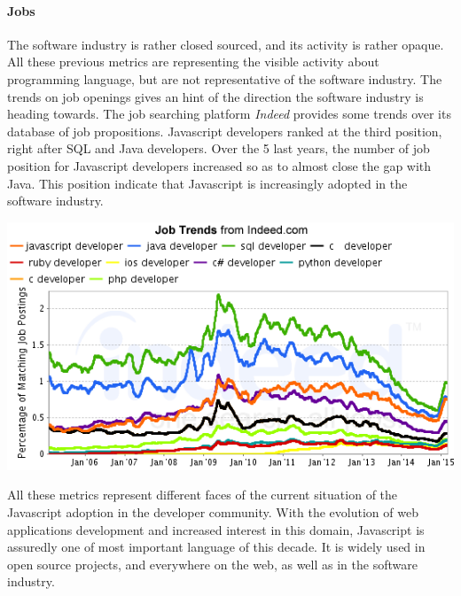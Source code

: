 
\paragraph{Jobs}

The software industry is rather closed sourced, and its activity is rather opaque.
All these previous metrics are representing the visible activity about programming language, but are not representative of the software industry.
The trends on job openings gives an hint of the direction the software industry is heading towards.
The job searching platform \textit{Indeed} provides some trends over its database of job propositions.
Javascript developers ranked at the third position, right after SQL and Java developers.
Over the 5 last years, the number of job position for Javascript developers increased so as to almost close the gap with Java.
This position indicate that Javascript is increasingly adopted in the software industry.

\includegraphics[width=0.9\linewidth]{../../data/js-trends/jobgraph}



All these metrics represent different faces of the current situation of the Javascript adoption in the developer community.
With the evolution of web applications development and increased interest in this domain, Javascript is assuredly one of most important language of this decade.
It is widely used in open source projects, and everywhere on the web, as well as in the software industry.